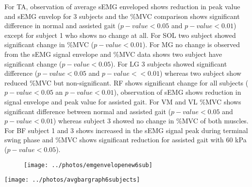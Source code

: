 \documentclass[letterpaper, 10 pt, conference]{ieeeconf}  %
\begin{document}
For TA, observation of average sEMG enveloped shows reduction in peak value and sEMG envelop for 3 subjects and the \%MVC comparison shows significant difference in normal and assisted gait ($p-value < 0.05$ and $p-value < 0.01$) except for subject 1 who shows no change at all. For SOL two subject showed significant change in \%MVC ($p-value < 0.01$). For MG no change is observed from the sEMG signal envelope and \%MVC data shows two subject have significant change ($p-value < 0.05$). For LG 3 subjects showed significant difference ($p-value < 0.05$ and $p-value < <0.01$) whereas two subject show reduced \%MVC but non-significant. RF shows significant change for all subjects ($p-value < 0.05$ an $p-value < 0.01$), observation of sEMG shows reduction in signal envelope and peak value for assisted gait. For VM and VL \%MVC shows significant difference between normal and assisted gait ($p-value < 0.05$ and $p-value < 0.01$) whereas subject 3 showed no change in \%MVC of both muscles. For BF subject 1 and 3 shows increased in the sEMG signal peak during terminal swing phase and \%MVC shows significant reduction for assisted gait with 60 kPa ($p-value < 0.05$).

\begin{figure}
	\centering
	\texttt{[image: ../photos/emgenvelopenew6sub]}
	\caption{}
	\label{fig:emgenvelopenew6sub}
\end{figure}

\begin{figure*}
	\centering
	\texttt{[image: ../photos/avgbargraph6subjects]}
	\caption{}
	\label{fig:avgbargraph6subjects}
\end{figure*}
\end{document}
